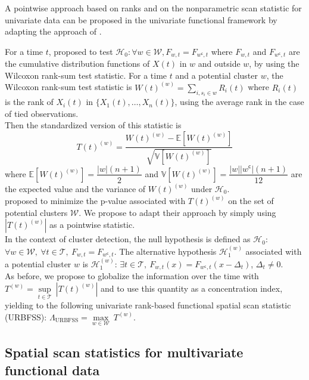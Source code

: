 A pointwise approach based on ranks and on the nonparametric scan statistic for univariate data \citep{A_nonparametric_spatial} can be proposed in the univariate functional framework by adapting the approach of \citet{notre_fonctionnel1}.

\noindent For a time $t$, \citet{A_nonparametric_spatial} proposed to test $\mathcal{H}_0: \forall w \in \mathcal{W}, F_{w,t} = F_{w^\mathsf{c},t}$ where $F_{w,t}$ and $F_{w^\mathsf{c},t}$ are the cumulative distribution functions of $X(t)$ in $w$ and outside $w$, by using the
Wilcoxon rank-sum test statistic. For a time $t$ and a potential cluster $w$, the Wilcoxon rank-sum test statistic is $\displaystyle{W(t)^{(w)} = \sum_{i, s_i \in w} R_i(t)}$ where $R_i(t)$ is the rank of $X_i(t)$ in $\{ X_1(t), \dots, X_n(t) \}$, using the average rank in the case of tied observations. \\
Then the standardized version of this statistic is $$T(t)^{(w)} = \dfrac{W(t)^{(w)} - \mathbb{E}[W(t)^{(w)}]}{\sqrt{\mathbb{V}[W(t)^{(w)}]}}$$ where 
$\mathbb{E}[W(t)^{(w)}] = \dfrac{|w|(n+1)}{2}$ and $\mathbb{V}[W(t)^{(w)}] = \dfrac{|w| |w^\mathsf{c}| (n+1)}{12}$ are the expected value and the variance of $W(t)^{(w)}$ under $\mathcal{H}_0$. \\ \citet{A_nonparametric_spatial} proposed to minimize the p-value associated with $T(t)^{(w)}$ on the set of potential clusters $\mathcal{W}$. We propose to adapt their approach by simply using $|T(t)^{(w)}|$ as a pointwise statistic. \\

\noindent In the context of cluster detection, the null hypothesis is defined as $\mathcal{H}_0$: $\forall w \in \mathcal{W}, \ \forall t \in \mathcal{T}, \ F_{w,t} = F_{w^\mathsf{c},t}$. The alternative hypothesis $\mathcal{H}_1^{(w)}$ associated with a potential cluster $w$ is $\mathcal{H}_1^{(w)}$: $\exists t \in \mathcal{T}, \ F_{w,t}(x) = F_{w^\mathsf{c},t}(x-\Delta_t)$, $\Delta_t \neq 0$. \\

\noindent As before, we propose to globalize the information over the time with $T^{(w)} = \underset{t \in \mathcal{T}}{\sup} \ |T(t)^{(w)}|$ and to use this quantity as a concentration index, yielding to the following univariate rank-based functional spatial scan statistic (URBFSS): $\Lambda_{\text{URBFSS}} = \underset{w \in \mathcal{W}}{\max} \ T^{(w)}$.


\subsection{Spatial scan statistics for multivariate functional data}


